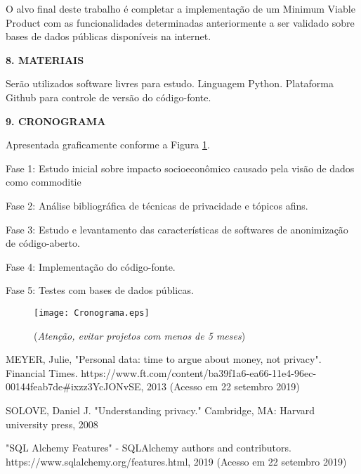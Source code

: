 \documentclass[a4paper,12pt,oneside,openany]{report}
\begin{document}
O alvo final deste trabalho é completar a implementação de um Minimum Viable Product com as funcionalidades determinadas anteriormente a ser validado sobre bases de dados públicas disponíveis na internet.

\vspace{0.4cm}
\textbf{8. MATERIAIS}
	
Serão utilizados software livres para estudo. Linguagem Python. Plataforma Github para controle de versão do código-fonte.

\vspace{0.4cm}
\textbf{9. CRONOGRAMA}

Apresentada graficamente conforme a Figura \ref{Fig:Cronograma}.

Fase 1: Estudo inicial sobre impacto socioeconômico causado pela visão de dados como commoditie

Fase 2: Análise bibliográfica de técnicas de privacidade e tópicos afins.

Fase 3: Estudo e levantamento das características de softwares de anonimização de código-aberto.

Fase 4: Implementação do código-fonte.

Fase 5: Testes com bases de dados públicas.


\begin{figure}
\begin{center}
\parbox[h]{14cm}
  {
  \begin{center}
  \texttt{[image: Cronograma.eps]}
  \caption[\small{(\textit{Atenção, evitar projetos com menos de 5 meses})}]{\label{Fig:Cronograma} \footnotesize{(\textit{Atenção, evitar projetos com menos de 5 meses})}}
  \end{center}
  }
\end{center}
\end{figure} 

\begin{thebibliography}{}

 MEYER, Julie, "Personal data: time to argue about money, not privacy". Financial Times. https://www.ft.com/content/ba39f1a6-ea66-11e4-96ec-00144feab7de#ixzz3YcJONvSE, 2013 (Acesso em 22 setembro 2019)

 SOLOVE, Daniel J. "Understanding privacy." Cambridge, MA: Harvard university press, 2008

 "SQL Alchemy Features" - SQLAlchemy authors and contributors. https://www.sqlalchemy.org/features.html, 2019 (Acesso em 22 setembro 2019)

\end{thebibliography}
\end{document}
